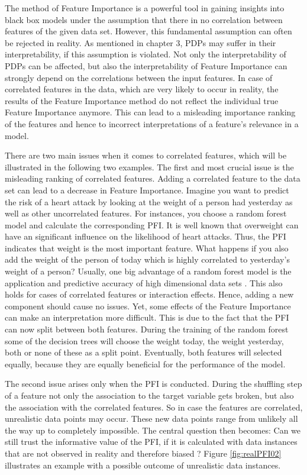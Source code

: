 \documentclass[
]{krantz}
\begin{document}
The method of Feature Importance is a powerful tool in gaining insights into black box models under the assumption that there in no correlation between features of the given data set. However, this fundamental assumption can often be rejected in reality. As mentioned in chapter 3, PDPs may suffer in their interpretability, if this assumption is violated. Not only the interpretability of PDPs can be affected, but also the interpretability of Feature Importance can strongly depend on the correlations between the input features. In case of correlated features in the data, which are very likely to occur in reality, the results of the Feature Importance method do not reflect the individual true Feature Importance anymore. This can lead to a misleading importance ranking of the features and hence to incorrect interpretations of a feature's relevance in a model.

There are two main issues when it comes to correlated features, which will be illustrated in the following two examples. The first and most crucial issue is the misleading ranking of correlated features. Adding a correlated feature to the data set can lead to a decrease in Feature Importance. Imagine you want to predict the risk of a heart attack by looking at the weight of a person had yesterday as well as other uncorrelated features. For instances, you choose a random forest model and calculate the corresponding PFI. It is well known that overweight can have an significant influence on the likelihood of heart attacks. Thus, the PFI indicates that weight is the most important feature. What happens if you also add the weight of the person of today which is highly correlated to yesterday's weight of a person? Usually, one big advantage of a random forest model is the application and predictive accuracy of high dimensional data sets \citep{strobl2008}. This also holds for cases of correlated features or interaction effects. Hence, adding a new component should cause no issues. Yet, some effects of the Feature Importance can make an interpretation more difficult. This is due to the fact that the PFI can now split between both features. During the training of the random forest some of the decision trees will choose the weight today, the weight yesterday, both or none of these as a split point. Eventually, both features will selected equally, because they are equally beneficial for the performance of the model. \citep{molnar2019}

The second issue arises only when the PFI is conducted. During the shuffling step of a feature not only the association to the target variable gets broken, but also the association with the correlated features. So in case the features are correlated, unrealistic data points may occur. These new data points range from unlikely all the way up to completely impossible. The central question then becomes: Can we still trust the informative value of the PFI, if it is calculated with data instances that are not observed in reality and therefore biased \citep{molnar2019}? Figure \ref{fig:realPFI02} illustrates an example with a possible outcome of unrealistic data instances.
\end{document}
